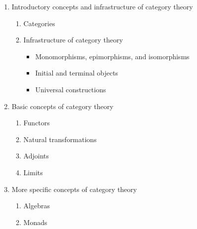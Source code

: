 \begin{enumerate}
\item Introductory concepts and infrastructure of category theory
  \begin{enumerate}
  \item Categories
  \item Infrastructure of category theory
    \begin{itemize}
    \item Monomorphisms, epimorphisms, and isomorphisms
    \item Initial and terminal objects
    \item Universal constructions
    \end{itemize}
  \end{enumerate}
\item Basic concepts of category theory
  \begin{enumerate}
  \item Functors
  \item Natural transformations
  \item Adjoints
  \item Limits
  \end{enumerate}
\item More specific concepts of category theory
  \begin{enumerate}
  \item Algebras
  \item Monads
  \end{enumerate}
\end{enumerate}

\clearemptydoublepage
